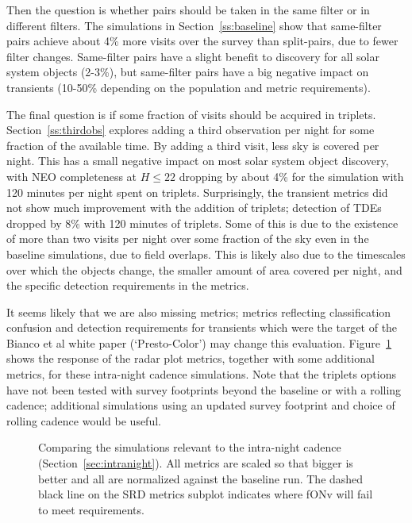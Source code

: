 Then the question is whether pairs should be taken in the same filter or in different filters. The simulations in Section~\ref{ss:baseline} show that same-filter pairs achieve about 4\% more visits over the survey than split-pairs, due to fewer filter changes. Same-filter pairs have a slight benefit to discovery for all solar system objects (2-3\%), but same-filter pairs have a big negative impact on transients (10-50\% depending on the population and metric requirements). 

The final question is if some fraction of visits should be acquired in triplets. Section~\ref{ss:thirdobs} explores adding a third observation per night for some fraction of the available time. By adding a third visit, less sky is covered per night. This has a small negative impact on most solar system object discovery, with NEO completeness at $H\le22$ dropping by about 4\% for the simulation with 120 minutes per night spent on triplets. Surprisingly, the transient metrics did not show much improvement with the addition of triplets; detection of TDEs dropped by 8\% with 120 minutes of triplets. Some of this is due to the existence of more than two visits per night over some fraction of the sky even in the baseline simulations, due to field overlaps. This is likely also due to the timescales over which the objects change, the smaller amount of area covered per night, and the specific detection requirements in the metrics.  

It seems likely that we are also missing metrics; metrics reflecting classification confusion and detection requirements for transients which were the target of the Bianco et al white paper (`Presto-Color') may change this evaluation. Figure~\ref{fig:intranight} shows the response of the radar plot metrics, together with some additional metrics, for these intra-night cadence simulations. Note that the triplets options have not been tested with survey footprints beyond the baseline or with a rolling cadence; additional simulations using an updated survey footprint and choice of rolling cadence would be useful. 

\begin{figure}
\caption{Comparing the simulations relevant to the intra-night cadence (Section~\ref{sec:intranight}). All metrics are scaled so that bigger is better and all are normalized against the baseline run. The dashed black line on the SRD metrics subplot indicates where fONv will fail to meet requirements.}
\label{fig:intranight}
\end{figure}


